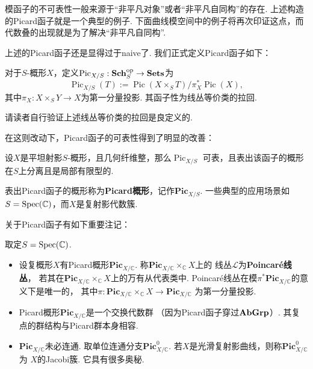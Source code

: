     模函子的不可表性一般来源于“非平凡对象”或者“非平凡自同构”的存在. 
    上述构造的Picard函子就是一个典型的例子. 
    下面曲线模空间中的例子将再次印证这点，而代数叠的出现就是为了解决“非平凡自同构”.
    
    上述的Picard函子还是显得过于naive了. 我们正式定义Picard函子如下：
    \begin{definition}
        对于$S$-概形$X$，定义$\operatorname{Pic}_{X/S}:\mathbf{Sch}_{S}^{\mathrm{op}} \to \mathbf{Sets}$为
        \[\operatorname{Pic}_{X/S}(T) := 
        \operatorname{Pic}(X \times_{S} T)/\pi_{X}^{*}\operatorname{Pic}(X),\]
        其中$\pi_{X}:X \times_{S} Y \to X$为第一分量投影. 
        其函子性为线丛等价类的拉回.
    \end{definition}
    请读者自行验证上述线丛等价类的拉回是良定义的.

    在这则改动下，Picard函子的可表性得到了明显的改善：
    \begin{theorem}[Grothendieck可表性定理]
        设$X$是平坦射影$S$-概形，且几何纤维整，那么$\operatorname{Pic}_{X/S}$
        可表，且表出该函子的概形在$S$上分离且是局部有限型的.
    \end{theorem}
    表出Picard函子的概形称为\textbf{Picard概形}，记作$\mathbf{Pic}_{X/S}$.
    一些典型的应用场景如$S = \operatorname{Spec}(\mathbb{C})$，而$X$是复射影代数簇.

    关于Picard函子有如下重要注记：
    \begin{remark}
        取定$S = \operatorname{Spec}(\mathbb{C})$.
        \begin{itemize}
            \item[(1)] 设复概形$X$有Picard概形$\mathbf{Pic}_{X/\mathbb{C}}$.
            称$\mathbf{Pic}_{X/\mathbb{C}} \times_{\mathbb{C}} X$上的
            线丛$\mathscr{L}$为\textbf{Poincaré线丛}，
            若其在$\mathbf{Pic}_{X/\mathbb{C}} \times_{\mathbb{C}} X$上的万有从代表类中.
            Poincaré线丛在模$\pi^{*}\mathbf{Pic}_{X/\mathbb{C}}$的意义下是唯一的，
            其中$\pi:\mathbf{Pic}_{X/\mathbb{C}} \times_{\mathbb{C}} X \to \mathbf{Pic}_{X/\mathbb{C}}$
            为第一分量投影.

            \item[(2)] Picard概形$\mathbf{Pic}_{X/\mathbb{C}}$是一个交换代数群
            （因为Picard函子穿过$\mathbf{AbGrp}$）. 其复点的群结构与Picard群本身相容.

            \item[(3)] $\mathbf{Pic}_{X/\mathbb{C}}$未必连通. 
            取单位连通分支$\mathbf{Pic}_{X/\mathbb{C}}^{0}$. 
            若$X$是光滑复射影曲线，则称$\mathbf{Pic}_{X/\mathbb{C}}^{0}$为
            $X$的Jacobi簇. 它具有很多奥秘.
        \end{itemize}
    \end{remark}

